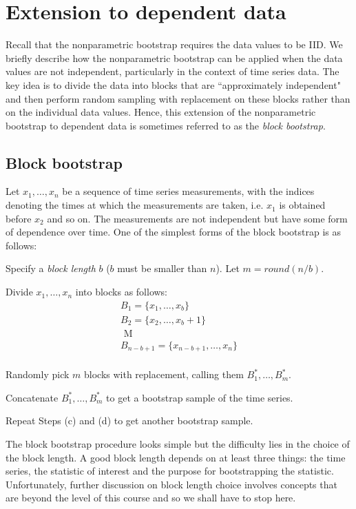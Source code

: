 \section{Extension to dependent data}
\work
Recall that the nonparametric bootstrap requires the data values to be IID. We briefly describe how the nonparametric bootstrap can be applied when the data values are not independent, particularly in the context of time series data. The key idea is to divide the data into blocks that are \textquotedblleft approximately independent" and then perform random sampling with replacement on these blocks rather than on the individual data values. Hence, this extension of the nonparametric bootstrap to dependent data is sometimes referred to as the {\it block bootstrap}.

\subsection{Block bootstrap}
\work
Let $x_1,\ldots,x_n$ be a sequence of time series measurements, with the indices denoting the times at which the measurements are taken, i.e. $x_1$ is obtained before $x_2$ and so on. The measurements are not independent but have some form of dependence over time. One of the simplest forms of the block bootstrap is as follows:
\begin{asparaenum}[(a)]
\item Specify a {\it block length} $b$ ($b$ must be smaller than $n$). Let $m=round(n/b)$.

\item	 Divide $x_1,\ldots,x_n$ into blocks as follows:
$$\begin{array}{l}
B_1=\{x_1,\ldots,x_b\}\\
B_2=\{x_2,\ldots,x_b+1\}\\
\textrm{        M      }\\
B_{n-b+1}=\{x_{n-b+1},\ldots,x_n\}\\
\end{array} $$


\item Randomly pick $m$ blocks with replacement, calling them $B_1^*,\ldots,B_m^*$.

\item Concatenate $B_1^*,\ldots,B_m^*$ to get a bootstrap sample of the time series.

\item 	Repeat Steps (c) and (d) to get another bootstrap sample.
\end{asparaenum}
The block bootstrap procedure looks simple but the difficulty lies in the choice of the block length. A good block length depends on at least three things: the time series, the statistic of interest and the purpose for bootstrapping the statistic. Unfortunately, further discussion on block length choice involves concepts that are beyond the level of this course and so we shall have to stop here.

